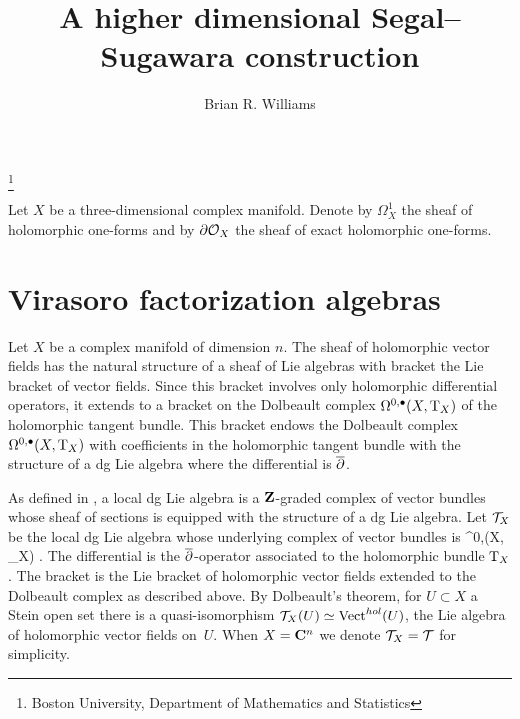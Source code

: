 \documentclass[11pt]{amsart}
\renewcommand{\op}{\operatorname}
\begin{document}
\title{A higher dimensional Segal--Sugawara construction}
\author{Brian R. Williams}
\thanks{Boston University, Department of Mathematics and Statistics}
\maketitle

Let $X$ be a three-dimensional complex manifold. Denote by $\Omega^1_X$ the sheaf of holomorphic one-forms and by $\partial \mathcal O_X$ the sheaf of exact holomorphic one-forms.

\section{Virasoro factorization algebras}

Let $X$ be a complex manifold of dimension $n$.
The sheaf of holomorphic vector fields has the natural structure of a sheaf of Lie algebras with bracket the Lie bracket of vector fields.
Since this bracket involves only holomorphic differential operators, it extends to a bracket on the Dolbeault complex $\Omega^{0,\bullet}(X,{\rm T}_X)$ of the holomorphic tangent bundle.
This bracket endows the Dolbeault complex $\Omega^{0,\bullet}(X, {\rm T}_X)$ with coefficients in the holomorphic tangent bundle with the structure of a dg Lie algebra where the differential is $\overline{\partial}$.

As defined in \cite{CG2}, a local dg Lie algebra is a $\mathbf{Z}$-graded complex of vector bundles whose sheaf of sections is equipped with the structure of a dg Lie algebra.
Let $\mathcal T_X$ be the local dg Lie algebra whose underlying complex of vector bundles is
\beqn
\Omega^{0,\bu}(X, \T_X) .
\eeqn
The differential is the $\overline{\partial}$-operator associated to the holomorphic bundle ${\rm T}_X$.
The bracket is the Lie bracket of holomorphic vector fields extended to the Dolbeault complex as described above.
By Dolbeault's theorem, for $U \subset X$ a Stein open set there is a quasi-isomorphism $\cT_X(U) \simeq \op{Vect}^{hol}(U)$, the Lie algebra of holomorphic vector fields on~$U$.
When $X = \mathbf{C}^n$ we denote $\mathcal T_X = \mathcal T$ for simplicity.
\end{document}
